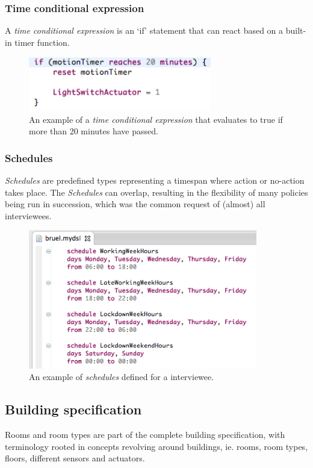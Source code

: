 \documentclass{llncs}
\begin{document}
\subsubsection{Time conditional expression}\label{subsubsec:conditionalexpression}
A \textit{time conditional expression} is an `if' statement that can react based on a built-in timer function. 

\begin{figure}
  \centering
    \includegraphics[width=8cm]{dsl-conditional-time-expression.png} 
	\caption{An example of a \textit{time conditional expression} that evaluates to true if more than 20 minutes have passed.}
	\label{fig:dsl-conditionalexpression}
\end{figure}

\newpage
\subsubsection{Schedules}\label{subsubsec:schedules}
\textit{Schedules} are predefined types representing a timespan where action or no-action takes place. The \textit{Schedules} can overlap, resulting in the flexibility of many policies being run in succession, which was the common request of (almost) all interviewees.

\begin{figure}
  	\centering
    \includegraphics[width=10cm]{dsl-schedules.png}
	\caption{An example of \textit{schedules} defined for a interviewee.}
	\label{fig:dsl-schedules}
\end{figure}

\newpage
\subsection{Building specification}\label{subsec:buildingspecification}
Rooms and room types are part of the complete building specification, with terminology rooted in concepts revolving around buildings, ie. rooms, room types, floors, different sensors and actuators. \\
\end{document}

